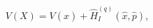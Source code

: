 \begin{equation}
\label{Eq:q-potential}
V(X)=V(\hat x) +\hat H^{(q)}_I(\hat x,\hat p),
\end{equation}

